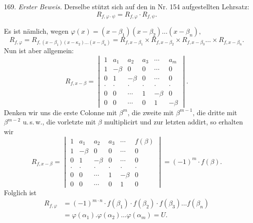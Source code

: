 169. \textit{Erster Beweis.} Derselbe stützt sich auf den in Nr. 154
aufgestellten Lehrsatz:
\[
R_{f,\varphi \cdot \psi} = R_{f,\varphi} \cdot R_{f,\psi}.
\]


Es ist nämlich, wegen $\varphi(x) = (x - \beta_1)(x - \beta_2) \ldots (x - \beta_n),$
\[
R_{f,\varphi} = R_{f,(x-\beta_1)(x-\kappa_2)\ldots(x-\beta_n)} = R_{f,x-\beta_1} \times R_{f,x-\beta_2} \times R_{f,x-\beta_3} \ldots \times R_{f,x-\beta_n}. %
\]
Nun ist aber allgemein:
\[
R_{f,x-\beta} =
\begin{vmatrix}
1 & a_1 & a_2 & a_3 & \cdots & a_m \\
1 & -\beta & 0 & 0 & \cdots & 0 \\
0 & 1 & -\beta & 0 & \cdots & 0 \\
\cdot & \cdot & \cdot & \cdot & \cdot & \cdot \\
0 & 0 & \cdots & 1 & -\beta & 0 \\
0 & 0 & \cdots & 0 & 1 & -\beta
\end{vmatrix}.
\]
Denken wir uns die erste Colonne mit $\beta^m$, die zweite mit
$\beta^{m-1}$, die dritte mit $\beta^{m-2}$ u.\,s.\,w., die vorletzte mit
$\beta$ multiplicirt und zur letzten addirt, so erhalten wir
\[
R_{f,x-\beta} =
\begin{vmatrix}
1 & a_1 & a_2 & a_3 & \cdots & f(\beta) \\
1 & -\beta & 0 & 0 & \cdots & 0 \\
0 & 1 & -\beta & 0 & \cdots & 0 \\
\cdot & \cdot & \cdot & \cdot & \cdot & \cdot \\
0 & 0 & \cdots & 1 & -\beta & 0 \\
0 & 0 & \cdots & 0 & 1 & 0
\end{vmatrix}
= (-1)^m \cdot f(\beta).
\]
Folglich ist
\[
\begin{aligned}
R_{f,\varphi} &= (-1)^{m \cdot n} \cdot f(\beta_1) \cdot f(\beta_2) \cdot f(\beta_3) \ldots f(\beta_n) \\
&= \varphi(\alpha_1) . \varphi(\alpha_2) \ldots \varphi(\alpha_m) = U.
\end{aligned}
\]

